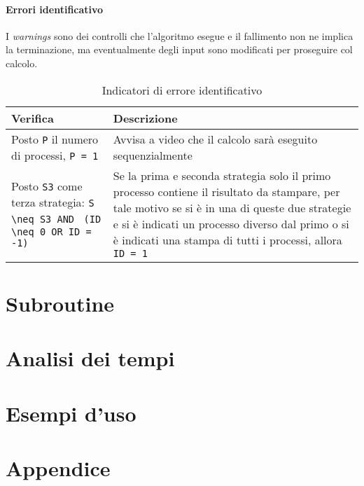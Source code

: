 \documentclass[a4paper,11pt]{book}
\begin{document}
\subsubsection{Errori identificativo}
I \textit{warnings} sono dei controlli che l'algoritmo esegue e il fallimento non ne implica la terminazione, ma eventualmente degli input sono modificati per proseguire col calcolo.
\begin{table}[H]
    \begin{tabular}{| p{} | p{} |}
        \hline
        \rowcolor{header}
        \textbf{Verifica} & \textbf{Descrizione} \\
        \hline
        Posto \verb|P| il numero di processi, \verb|P = 1| & 
        Avvisa a video che il calcolo sarà eseguito sequenzialmente\\
        \hline
        Posto \verb|S3| come terza strategia: \verb|S \neq S3 AND| \verb| (ID \neq 0 OR ID = -1)| & 
        Se la prima e seconda strategia solo il primo processo contiene il risultato da stampare, per tale motivo se si è in una di queste due strategie e si è indicati un processo diverso dal primo o si è indicati una stampa di tutti i processi, allora \verb|ID = 1| \\
        \hline
    \end{tabular}
    \caption{Indicatori di errore identificativo}
    \label{tab:Indicatori di errore identificativo}
\end{table}


\chapter{Subroutine}
\chapter{Analisi dei tempi}
\chapter{Esempi d'uso}
\chapter{Appendice}
\end{document}
